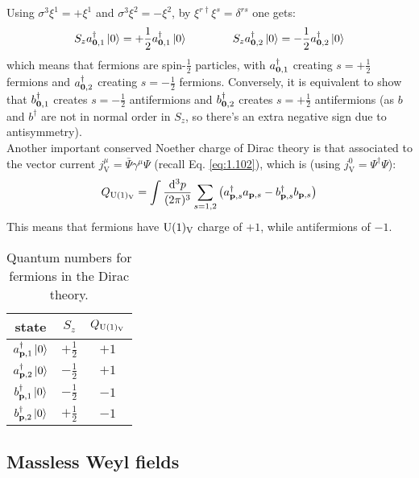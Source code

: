 Using $ \sigma^3 \xi^1 = + \xi^1 $ and $ \sigma^3 \xi^2 = - \xi^2 $, by $ \xi^{r\dagger} \xi^s = \delta^{rs} $ one gets:
\begin{equation*}
  S_z a_{\mathbf{0},1}^\dagger \ket{0} = +\frac{1}{2} a_{\mathbf{0},1}^\dagger \ket{0}
  \qquad \qquad
  S_z a_{\mathbf{0},2}^\dagger \ket{0} = -\frac{1}{2} a_{\mathbf{0},2}^\dagger \ket{0}
\end{equation*}
which means that fermions are spin-$ \frac{1}{2} $ particles, with $ a_{\mathbf{0},1}^\dagger $ creating $ s = +\frac{1}{2} $ fermions and $ a_{\mathbf{0},2}^\dagger $ creating $ s = -\frac{1}{2} $ fermions. Conversely, it is equivalent to show that $ b_{\mathbf{0},1}^\dagger $ creates $ s = -\frac{1}{2} $ antifermions and $ b_{\mathbf{0},2}^\dagger $ creates $ s = +\frac{1}{2} $ antifermions (as $ b $ and $ b^\dagger $ are not in normal order in $ S_z $, so there's an extra negative sign due to antisymmetry).\\
Another important conserved Noether charge of Dirac theory is that associated to the vector current $ j^\mu_\text{V} = \bar{\Psi} \gamma^\mu \Psi $ (recall Eq. \ref{eq:1.102}), which is (using $ j^0_\text{V} = \Psi^\dagger \Psi $):
\begin{equation}
  Q_{\mathrm{U}(1)_\text{V}} = \int \frac{\mathrm{d}^3p}{(2\pi)^3} \sum_{s = 1,2} \left( a_{\mathbf{p},s}^\dagger a_{\mathbf{p},s} - b_{\mathbf{p},s}^\dagger b_{\mathbf{p},s} \right)
  \label{eq:2.27}
\end{equation}
This means that fermions have $ \mathrm{U}(1)_\text{V} $ charge of $ +1 $, while antifermions of $ -1 $.

\begin{table}[h!]
  \centering
  \begin{tabular}{ccc}
    \hline
    state & $ S_z $ & $ Q_{\mathrm{U}(1)_\text{V}} $ \\
    \hline
    \rule{0pt}{3ex} $ a_{\mathbf{p},1}^\dagger \ket{0} $ & $ +\tfrac{1}{2} $ & $ +1 $ \\
    \rule{0pt}{3ex} $ a_{\mathbf{p},2}^\dagger \ket{0} $ & $ -\tfrac{1}{2} $ & $ +1 $ \\
    \rule{0pt}{3ex} $ b_{\mathbf{p},1}^\dagger \ket{0} $ & $ -\tfrac{1}{2} $ & $ -1 $ \\
    \rule{0pt}{3ex} $ b_{\mathbf{p},2}^\dagger \ket{0} $ & $ +\tfrac{1}{2} $ & $ -1 $ \\
  \end{tabular}
  \caption{Quantum numbers for fermions in the Dirac theory.}
  \label{tab:dirac-qn}
\end{table}

\subsection{Massless Weyl fields}

